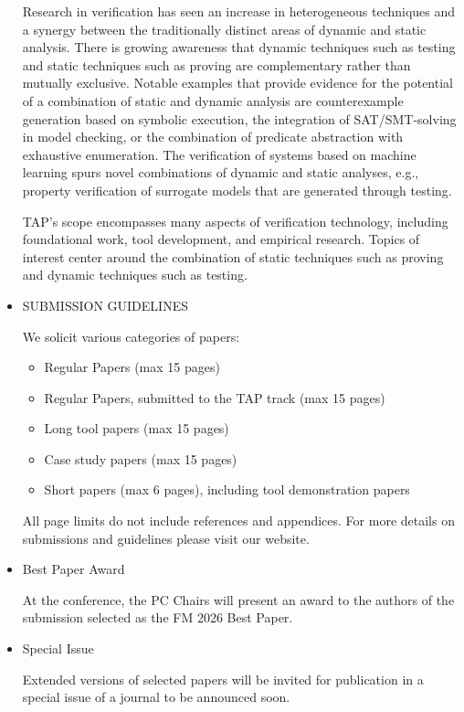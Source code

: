 \documentclass[prodmode,acmtecs]{acmsmall} %
\begin{document}
\begin{itemize}
  Research in verification has seen an increase in heterogeneous techniques and a synergy between the traditionally distinct areas of dynamic and static analysis. There is growing awareness that dynamic techniques such as testing and static techniques such as proving are complementary rather than mutually exclusive. Notable examples that provide evidence for the potential of a combination of static and dynamic analysis are counterexample generation based on symbolic execution, the integration of SAT/SMT-solving in model checking, or the combination of predicate abstraction with exhaustive enumeration. The verification of systems based on machine learning spurs novel combinations of dynamic and static analyses, e.g., property verification of surrogate models that are generated through testing. 
 
  TAP's scope encompasses many aspects of verification technology, including foundational work, tool development, and empirical research. Topics of interest center around the combination of static techniques such as proving and dynamic techniques such as testing. 
 
\item  SUBMISSION GUIDELINES 
 
  We solicit various categories of papers: 
 
\begin{itemize}\item  Regular Papers (max 15 pages)
\item  Regular Papers, submitted to the TAP track (max 15 pages)
\item  Long tool papers (max 15 pages)
\item  Case study papers (max 15 pages)
\item  Short papers (max 6 pages), including tool demonstration papers
\end{itemize} 
  All page limits do not include references and appendices. For more details on submissions and guidelines please visit our website.  
 
\item  Best Paper Award  
 
  At the conference, the PC Chairs will present an award to the authors of the submission selected as the FM 2026 Best Paper. 
 
\item  Special Issue 
 
  Extended versions of selected papers will be invited for publication in a special issue of a journal to be announced soon. 
 

\end{itemize}
\end{document}
